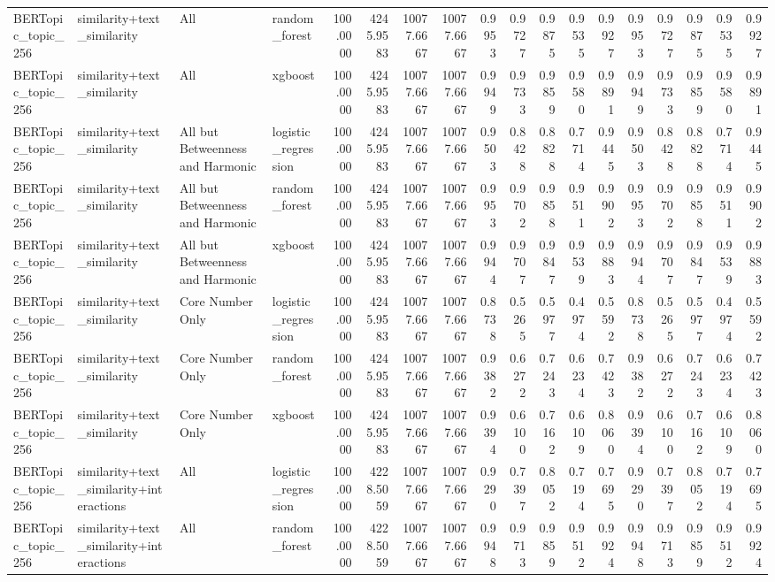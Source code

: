 \begin{tabular}{llllrrrrrrrrrrrrrr}
BERTopic_topic_256 & similarity+text_similarity & All & random_forest & 100.0000 & 4245.9583 & 10077.6667 & 10077.6667 & 0.9953 & 0.9727 & 0.9875 & 0.9535 & 0.9927 & 0.9953 & 0.9727 & 0.9875 & 0.9535 & 0.9927 \\
BERTopic_topic_256 & similarity+text_similarity & All & xgboost & 100.0000 & 4245.9583 & 10077.6667 & 10077.6667 & 0.9949 & 0.9733 & 0.9859 & 0.9580 & 0.9891 & 0.9949 & 0.9733 & 0.9859 & 0.9580 & 0.9891 \\
BERTopic_topic_256 & similarity+text_similarity & All but Betweenness and Harmonic & logistic_regression & 100.0000 & 4245.9583 & 10077.6667 & 10077.6667 & 0.9503 & 0.8428 & 0.8828 & 0.7714 & 0.9445 & 0.9503 & 0.8428 & 0.8828 & 0.7714 & 0.9445 \\
BERTopic_topic_256 & similarity+text_similarity & All but Betweenness and Harmonic & random_forest & 100.0000 & 4245.9583 & 10077.6667 & 10077.6667 & 0.9953 & 0.9702 & 0.9858 & 0.9511 & 0.9902 & 0.9953 & 0.9702 & 0.9858 & 0.9511 & 0.9902 \\
BERTopic_topic_256 & similarity+text_similarity & All but Betweenness and Harmonic & xgboost & 100.0000 & 4245.9583 & 10077.6667 & 10077.6667 & 0.9944 & 0.9707 & 0.9847 & 0.9539 & 0.9883 & 0.9944 & 0.9707 & 0.9847 & 0.9539 & 0.9883 \\
BERTopic_topic_256 & similarity+text_similarity & Core Number Only & logistic_regression & 100.0000 & 4245.9583 & 10077.6667 & 10077.6667 & 0.8738 & 0.5265 & 0.5977 & 0.4974 & 0.5592 & 0.8738 & 0.5265 & 0.5977 & 0.4974 & 0.5592 \\
BERTopic_topic_256 & similarity+text_similarity & Core Number Only & random_forest & 100.0000 & 4245.9583 & 10077.6667 & 10077.6667 & 0.9382 & 0.6272 & 0.7243 & 0.6234 & 0.7423 & 0.9382 & 0.6272 & 0.7243 & 0.6234 & 0.7423 \\
BERTopic_topic_256 & similarity+text_similarity & Core Number Only & xgboost & 100.0000 & 4245.9583 & 10077.6667 & 10077.6667 & 0.9394 & 0.6100 & 0.7162 & 0.6109 & 0.8060 & 0.9394 & 0.6100 & 0.7162 & 0.6109 & 0.8060 \\
BERTopic_topic_256 & similarity+text_similarity+interactions & All & logistic_regression & 100.0000 & 4228.5059 & 10077.6667 & 10077.6667 & 0.9290 & 0.7397 & 0.8052 & 0.7194 & 0.7695 & 0.9290 & 0.7397 & 0.8052 & 0.7194 & 0.7695 \\
BERTopic_topic_256 & similarity+text_similarity+interactions & All & random_forest & 100.0000 & 4228.5059 & 10077.6667 & 10077.6667 & 0.9948 & 0.9713 & 0.9859 & 0.9512 & 0.9924 & 0.9948 & 0.9713 & 0.9859 & 0.9512 & 0.9924 \\

\end{tabular}
